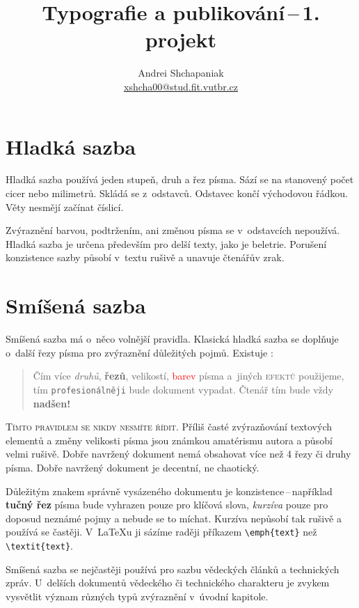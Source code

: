 \documentclass[a4paper, 10pt, twocolumn]{article}
\title{Typografie a publikování\,--\,1. projekt}
\author{Andrei Shchapaniak \\
        \url{xshcha00@stud.fit.vutbr.cz}}
\date{}
\begin{document}
\maketitle
\section{Hladká sazba}
Hladká sazba používá jeden stupeň, druh a řez písma.
Sází se na stanovený počet cicer nebo milimetrů.
Skládá se z~odstavců. Odstavec končí východovou řádkou.
Věty nesmějí začínat číslicí. \par
Zvýraznění barvou, podtržením, ani změnou písma se v~odstavcích nepoužívá.
Hladká sazba je určena především pro delší texty, jako je beletrie.
Porušení konzistence sazby působí v~textu rušivě a unavuje čtenářův zrak.
\section{Smíšená sazba}
Smíšená sazba má o~něco volnější pravidla.
Klasická hladká sazba se doplňuje o~další řezy písma pro zvýraznění důležitých pojmů.
Existuje :
\begin{quotation}
Čím více \textit{druhů}, \textbf{řezů}, {\tiny velikostí}, \textcolor{red}{barev}
písma a~jiných \textsc{efektů} použijeme, tím \verb=profesionálněji=
bude {\Large{}\selectfont dokument \fontfamily{\familydefault}\selectfont}vypadat.
{\huge Č}{\LARGE t}{\Large e}{\large n}á{\small ř}
{\footnotesize t}{\scriptsize í}{\tiny m} bude vždy \textbf{\huge nadšen!}
\end{quotation}
\textsc{Tímto pravidlem se nikdy nesmíte řídit.}
Příliš časté zvýrazňování textových elementů a změny velikosti písma jsou známkou
amatérismu autora a působí velmi rušivě.
Dobře navržený dokument nemá obsahovat více než 4 řezy či druhy písma.
Dobře navržený dokument je decentní, ne chaotický. \par
Důležitým znakem správně vysázeného dokumentu je konzistence\,--\,například
\textbf{tučný řez} písma bude vyhrazen pouze pro klíčová slova,
\textit{kurzíva} pouze pro doposud neznámé pojmy a nebude se to míchat.
Kurzíva nepůsobí tak rušivě a používá se častěji.
V~\LaTeX u ji sázíme raději příkazem \verb=\emph{text}= než \verb=\textit{text}=. \par
Smíšená sazba se nejčastěji používá pro sazbu vědeckých článků a technických zpráv.
U~delších dokumentů vědeckého či technického charakteru je zvykem vysvětlit význam
různých typů zvýraznění v~úvodní kapitole.
\end{document}
